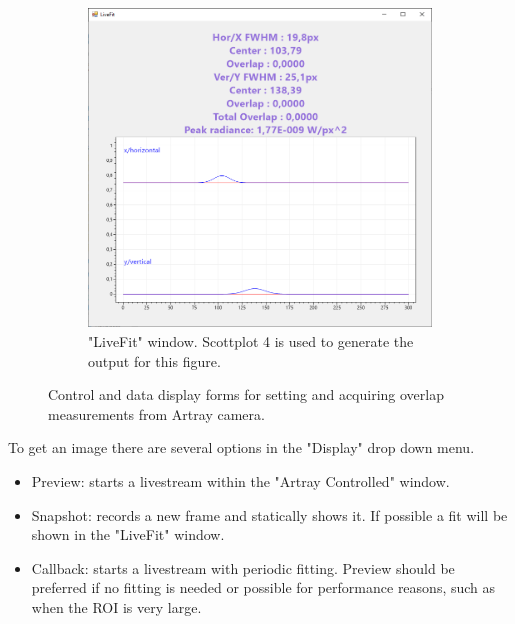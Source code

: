 \documentclass[twoside,openright,listof=numbered]{scrreprt}
\begin{document}
\begin{figure}[hbtp]
\begin{subfigure}[t]{0.49\linewidth}
\includegraphics[width = \columnwidth]{images/ArtrayExamplePics/FittingForm.PNG}
\caption{"LiveFit" window. Scottplot 4\cite{ScottPlot4} is used to generate the output for this figure.\label{fig:ArtrayFitting}}
\end{subfigure}
\caption{Control and data display forms for setting and acquiring overlap measurements from Artray camera.}
\end{figure}


To get an image there are several options in the "Display" drop down menu.
\begin{itemize}
\item Preview: starts a livestream within the "Artray Controlled" window.
\item Snapshot: records a new frame and statically shows it. If possible a fit will be shown in the "LiveFit" window.
\item Callback: starts a livestream with periodic fitting. Preview should be preferred if no fitting is needed or possible for performance reasons, such as when the ROI is very large.
\end{itemize}
\end{document}
